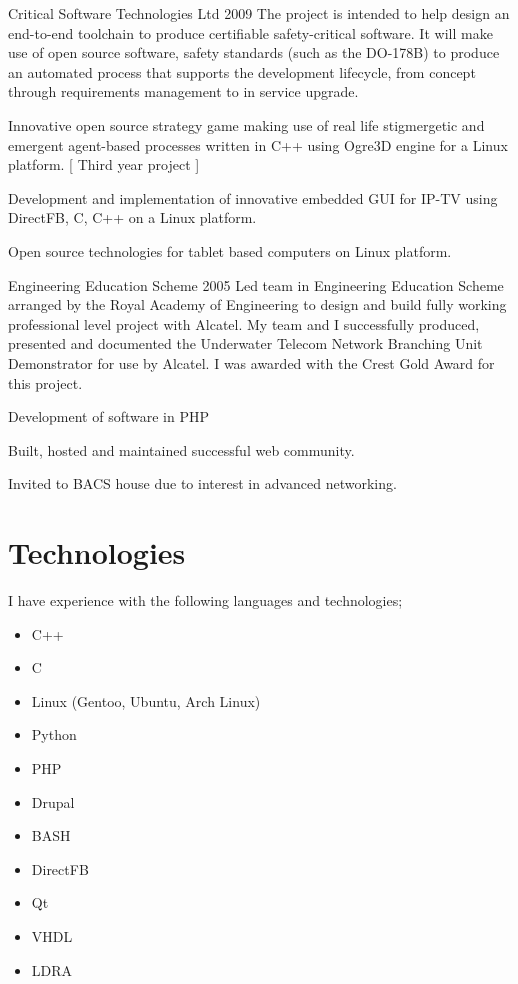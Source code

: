 \documentclass[overlapped,line,letterpaper]{res}
\begin{document}
\begin{resume}
  {Critical Software Technologies Ltd}
  {2009}
{
    The project is intended to help design an end-to-end toolchain to produce
    certifiable safety-critical software.
    It will make use of open source software, safety standards (such as the
    DO-178B) to produce an automated process that supports the development
    lifecycle, from concept through requirements management to in service
    upgrade.
}

{
    Innovative open source strategy game making use of real life stigmergetic
    and emergent agent-based processes written in C++ using Ogre3D engine for a
    Linux platform. [ Third year project ]
}

{
    Development and implementation of innovative embedded GUI for IP-TV using
    DirectFB, C, C++ on a Linux platform.
}

{
    Open source technologies for tablet based computers on Linux platform.
}

  {Engineering Education Scheme}
  {2005}
{
    Led team in Engineering Education Scheme arranged by the Royal Academy of
    Engineering to design and build fully working professional level project
    with Alcatel.
    My team and I successfully produced, presented and documented the Underwater
    Telecom Network Branching Unit Demonstrator for use by Alcatel.
    I was awarded with the Crest Gold Award for this project.
}

{
    Development of software in PHP
}

{
    Built, hosted and maintained successful web community.
}

{
        Invited to BACS house due to interest in advanced networking.
}

\section{\bf{Technologies} }
I have experience with the following languages and technologies;
\begin{itemize}
 \item C++
 \item C
 \item Linux (Gentoo, Ubuntu, Arch Linux)
 \item Python
 \item PHP
 \item Drupal
 \item BASH
 \item DirectFB
 \item Qt
 \item VHDL
 \item LDRA
\end{itemize}


\end{resume}
\end{document}
